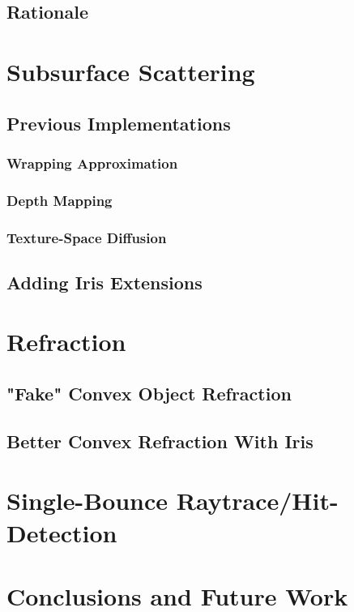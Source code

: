 \documentclass[a4paper, 12pt]{article}
\begin{document}
\subsection{Rationale}





\section{Subsurface Scattering}



\subsection{Previous Implementations}

\subsubsection{Wrapping Approximation}

\subsubsection{Depth Mapping}

\subsubsection{Texture-Space Diffusion}

\subsection{Adding Iris Extensions}



\section{Refraction}

\subsection{"Fake" Convex Object Refraction}

\subsection{Better Convex Refraction With Iris}



\section{Single-Bounce Raytrace/Hit-Detection}

\section{Conclusions and Future Work}
\end{document}
